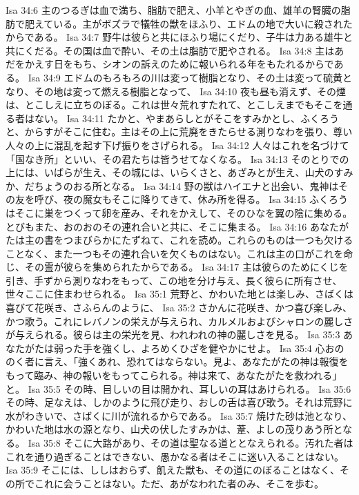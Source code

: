 Isa 34:6  主のつるぎは血で満ち、脂肪で肥え、小羊とやぎの血、雄羊の腎臓の脂肪で肥えている。主がボズラで犠牲の獣をほふり、エドムの地で大いに殺されたからである。
Isa 34:7  野牛は彼らと共にほふり場にくだり、子牛は力ある雄牛と共にくだる。その国は血で酔い、その土は脂肪で肥やされる。
Isa 34:8  主はあだをかえす日をもち、シオンの訴えのために報いられる年をもたれるからである。
Isa 34:9  エドムのもろもろの川は変って樹脂となり、その土は変って硫黄となり、その地は変って燃える樹脂となって、
Isa 34:10  夜も昼も消えず、その煙は、とこしえに立ちのぼる。これは世々荒れすたれて、とこしえまでもそこを通る者はない。
Isa 34:11  たかと、やまあらしとがそこをすみかとし、ふくろうと、からすがそこに住む。主はその上に荒廃をきたらせる測りなわを張り、尊い人々の上に混乱を起す下げ振りをさげられる。
Isa 34:12  人々はこれを名づけて「国なき所」といい、その君たちは皆うせてなくなる。
Isa 34:13  そのとりでの上には、いばらが生え、その城には、いらくさと、あざみとが生え、山犬のすみか、だちょうのおる所となる。
Isa 34:14  野の獣はハイエナと出会い、鬼神はその友を呼び、夜の魔女もそこに降りてきて、休み所を得る。
Isa 34:15  ふくろうはそこに巣をつくって卵を産み、それをかえして、そのひなを翼の陰に集める。とびもまた、おのおのその連れ合いと共に、そこに集まる。
Isa 34:16  あなたがたは主の書をつまびらかにたずねて、これを読め。これらのものは一つも欠けることなく、また一つもその連れ合いを欠くものはない。これは主の口がこれを命じ、その霊が彼らを集められたからである。
Isa 34:17  主は彼らのためにくじを引き、手ずから測りなわをもって、この地を分け与え、長く彼らに所有させ、世々ここに住まわせられる。
Isa 35:1  荒野と、かわいた地とは楽しみ、さばくは喜びて花咲き、さふらんのように、
Isa 35:2  さかんに花咲き、かつ喜び楽しみ、かつ歌う。これにレバノンの栄えが与えられ、カルメルおよびシャロンの麗しさが与えられる。彼らは主の栄光を見、われわれの神の麗しさを見る。
Isa 35:3  あなたがたは弱った手を強くし、よろめくひざを健やかにせよ。
Isa 35:4  心おののく者に言え、「強くあれ、恐れてはならない。見よ、あなたがたの神は報復をもって臨み、神の報いをもってこられる。神は来て、あなたがたを救われる」と。
Isa 35:5  その時、目しいの目は開かれ、耳しいの耳はあけられる。
Isa 35:6  その時、足なえは、しかのように飛び走り、おしの舌は喜び歌う。それは荒野に水がわきいで、さばくに川が流れるからである。
Isa 35:7  焼けた砂は池となり、かわいた地は水の源となり、山犬の伏したすみかは、葦、よしの茂りあう所となる。
Isa 35:8  そこに大路があり、その道は聖なる道ととなえられる。汚れた者はこれを通り過ぎることはできない、愚かなる者はそこに迷い入ることはない。
Isa 35:9  そこには、ししはおらず、飢えた獣も、その道にのぼることはなく、その所でこれに会うことはない。ただ、あがなわれた者のみ、そこを歩む。
